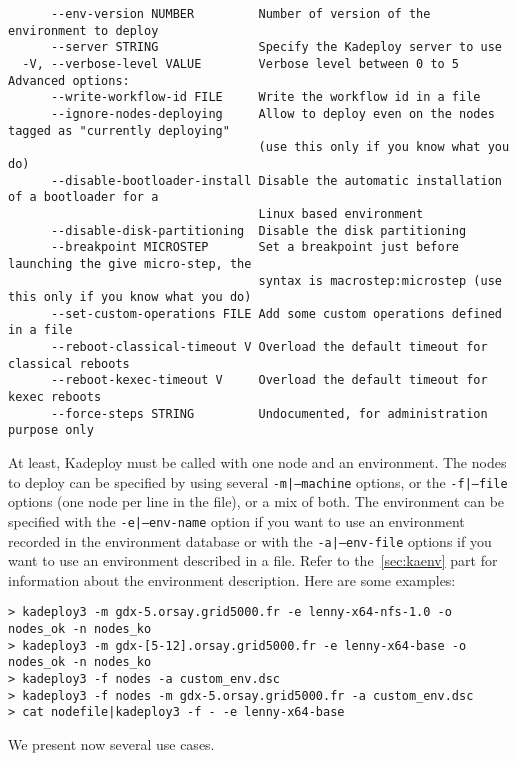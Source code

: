 \documentclass[a4wide,10pt,oneside]{book}
\begin{document}
\begin{small}
\begin{verbatim}
      --env-version NUMBER         Number of version of the environment to deploy
      --server STRING              Specify the Kadeploy server to use
  -V, --verbose-level VALUE        Verbose level between 0 to 5
Advanced options:
      --write-workflow-id FILE     Write the workflow id in a file
      --ignore-nodes-deploying     Allow to deploy even on the nodes tagged as "currently deploying" 
                                   (use this only if you know what you do)
      --disable-bootloader-install Disable the automatic installation of a bootloader for a 
                                   Linux based environment
      --disable-disk-partitioning  Disable the disk partitioning
      --breakpoint MICROSTEP       Set a breakpoint just before launching the give micro-step, the 
                                   syntax is macrostep:microstep (use this only if you know what you do)
      --set-custom-operations FILE Add some custom operations defined in a file
      --reboot-classical-timeout V Overload the default timeout for classical reboots
      --reboot-kexec-timeout V     Overload the default timeout for kexec reboots
      --force-steps STRING         Undocumented, for administration purpose only

\end{verbatim}
\end{small}

At least, Kadeploy must be called with one node and an environment. The nodes to deploy can be specified by using several \texttt{-m|--machine} options, or the \texttt{-f|--file} options (one node per line in the file), or a mix of both.
The environment can be specified with the \texttt{-e|--env-name} option if you want to use an environment recorded in the environment database or with the \texttt{-a|--env-file} options if you want to use an environment described in a file. Refer to the~\ref{sec:kaenv} part for information about the environment description. Here are some examples:
\begin{verbatim}
> kadeploy3 -m gdx-5.orsay.grid5000.fr -e lenny-x64-nfs-1.0 -o nodes_ok -n nodes_ko
> kadeploy3 -m gdx-[5-12].orsay.grid5000.fr -e lenny-x64-base -o nodes_ok -n nodes_ko
> kadeploy3 -f nodes -a custom_env.dsc
> kadeploy3 -f nodes -m gdx-5.orsay.grid5000.fr -a custom_env.dsc
> cat nodefile|kadeploy3 -f - -e lenny-x64-base
\end{verbatim}

We present now several use cases.
\end{document}
